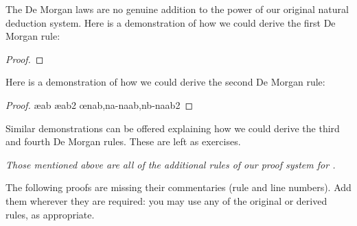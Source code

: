 \newpage
The De Morgan laws are no genuine addition to the power of our original natural deduction system. Here is a demonstration of how we could derive the first De Morgan rule:
 	\begin{proof}
		\open
			\open
			\close
			\open
			\close
		\close
	\end{proof}
Here is a demonstration of how we could derive the second De Morgan rule:
 	\begin{proof}
		\open
			\open
			\ae{ab}
			\close
			\close
			\open
			\open
			\ae{ab2}
			\close
			\close
		\oe{nab,na-naab,nb-naab2}
	\end{proof}
Similar demonstrations can be offered explaining how we could derive the third and fourth De Morgan rules. These are left as exercises.

\emph{Those mentioned above are all of the additional rules of our proof system for \TFL.}


\practiceproblems

\problempart
\label{pr.justifyTFLproof}
The following proofs are missing their commentaries (rule and line numbers). Add them wherever they are required: you may use any of the original or derived rules, as appropriate.

